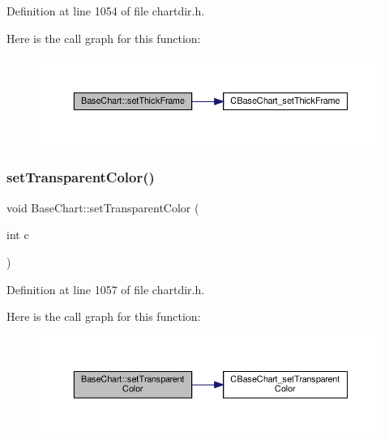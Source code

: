 Definition at line 1054 of file chartdir.\+h.

Here is the call graph for this function\+:
\nopagebreak
\begin{figure}[H]
\begin{center}
\leavevmode
\includegraphics[width=350pt]{class_base_chart_a204e0280f39dae0edc41b9b89b412131_cgraph}
\end{center}
\end{figure}
\mbox{\label{class_base_chart_aa24c1dca691c24ad711a0dd669b505c0}} 
\subsubsection{\texorpdfstring{set\+Transparent\+Color()}{setTransparentColor()}}
{\footnotesize\ttfamily void Base\+Chart\+::set\+Transparent\+Color (\begin{DoxyParamCaption}\item[{int}]{c }\end{DoxyParamCaption})\hspace{0.3cm}{\ttfamily [inline]}}



Definition at line 1057 of file chartdir.\+h.

Here is the call graph for this function\+:
\nopagebreak
\begin{figure}[H]
\begin{center}
\leavevmode
\includegraphics[width=350pt]{class_base_chart_aa24c1dca691c24ad711a0dd669b505c0_cgraph}
\end{center}
\end{figure}
\mbox{\label{class_base_chart_a736e897f2b7239817d17afa5ae48103a}} 
